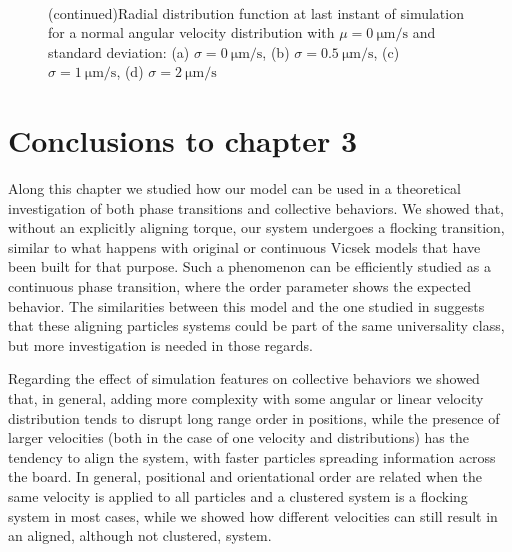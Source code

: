 \documentclass[../../master_thesis_np.tex]{subfiles}
\begin{document}
		\begin{figure}[t]
		\centering
		\ContinuedFloat
			\\
			
			\caption{(continued)Radial distribution function at last instant of simulation for a normal angular velocity distribution with $\mu = \SI{0}{\um\per\second}$ and standard deviation: (a) $\sigma = \SI{0}{\um\per\second}$, (b) $\sigma = \SI{0.5}{\um\per\second}$, (c) $\sigma = \SI{1}{\um\per\second}$, (d) $\sigma = \SI{2}{\um\per\second}$}
			\label{fig:lj_av_rdf}
		\end{figure}
		
    \section{Conclusions to chapter 3}
    \label{3concl}
    Along this chapter we studied how our model can be used in a theoretical investigation of both phase transitions and collective behaviors.
    We showed that, without an explicitly aligning torque, our system undergoes a flocking transition, similar to what happens with original or continuous Vicsek models that have been built for that purpose.
    Such a phenomenon can be efficiently studied as a continuous phase transition, where the order parameter shows the expected behavior.
    The similarities between this model and the one studied in \cite{martin-gomez_collective_2018} suggests that these aligning particles systems could be part of the same universality class, but more investigation is needed in those regards.
    
    Regarding the effect of simulation features on collective behaviors we showed that, in general, adding more complexity with some angular or linear velocity distribution tends to disrupt long range order in positions, while the presence of larger velocities (both in the case of one velocity and distributions) has the tendency to align the system, with faster particles spreading information across the board.
    In general, positional and orientational order are related when the same velocity is applied to all particles and a clustered system is a flocking system in most cases, while we showed how different velocities can still result in an aligned, although not clustered, system.
    
\end{document}
